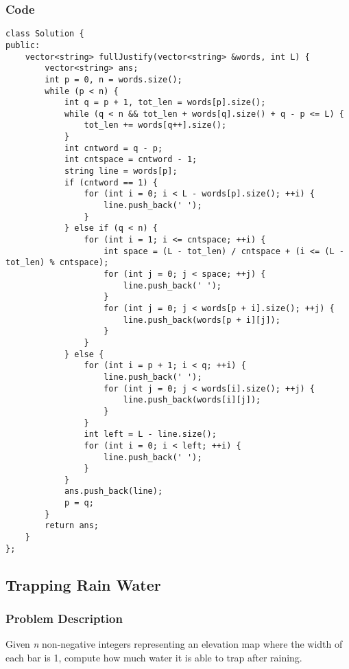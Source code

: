 \documentclass{article}
\begin{document}
\begin{CJK*}{UTF8}{gkai}
\subsubsection*{Code}
\begin{lstlisting}
class Solution {
public:
    vector<string> fullJustify(vector<string> &words, int L) {
        vector<string> ans;
        int p = 0, n = words.size();
        while (p < n) {
            int q = p + 1, tot_len = words[p].size();
            while (q < n && tot_len + words[q].size() + q - p <= L) {
                tot_len += words[q++].size();
            }
            int cntword = q - p;
            int cntspace = cntword - 1;
            string line = words[p];
            if (cntword == 1) {
                for (int i = 0; i < L - words[p].size(); ++i) {
                    line.push_back(' ');
                }
            } else if (q < n) {
                for (int i = 1; i <= cntspace; ++i) {
                    int space = (L - tot_len) / cntspace + (i <= (L - tot_len) % cntspace);
                    for (int j = 0; j < space; ++j) {
                        line.push_back(' ');
                    }
                    for (int j = 0; j < words[p + i].size(); ++j) {
                        line.push_back(words[p + i][j]);
                    }
                }
            } else {
                for (int i = p + 1; i < q; ++i) {
                    line.push_back(' ');
                    for (int j = 0; j < words[i].size(); ++j) {
                        line.push_back(words[i][j]);
                    }
                }
                int left = L - line.size();
                for (int i = 0; i < left; ++i) {
                    line.push_back(' ');
                }
            }
            ans.push_back(line);
            p = q;
        }
        return ans;
    }
}; 
\end{lstlisting}


\subsection{ Trapping Rain Water }
\label{ Trapping Rain Water }

\subsubsection*{Problem Description}
Given \emph{n} non-negative integers representing an elevation map where the width of each bar is 1, compute how much water it is able to trap after raining.


\end{CJK*}
\end{document}
